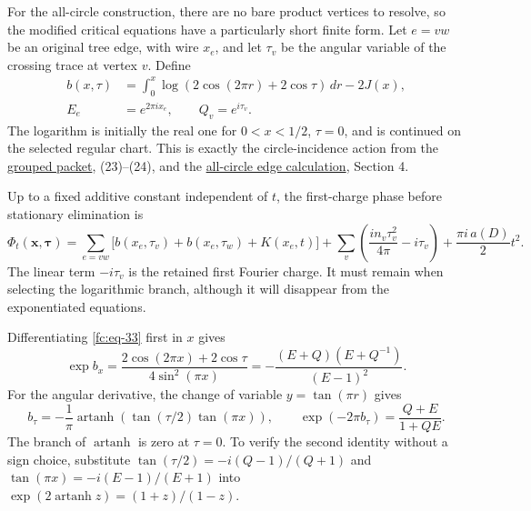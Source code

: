 For the all-circle construction, there are no bare product vertices to resolve, so the modified critical equations have a particularly short finite form. Let \(e=vw\) be an original tree edge, with wire \(x_e\), and let \(\tau_v\) be the angular variable of the crossing trace at vertex \(v\). Define
\begin{equation}\label{fc:eq-33}
\begin{aligned}
 b(x,\tau)
   &=\int_0^x\log(2\cos(2\pi r)+2\cos\tau)\,dr-2J(x),\\
 E_e&=e^{2\pi i x_e},\qquad Q_v=e^{i\tau_v}.
 \end{aligned}
\end{equation}
 The logarithm is initially the real one for \(0<x<1/2\), \(\tau=0\), and is continued on the selected regular chart. This is exactly the circle-incidence action from the \href{https://sashakolpakov.github.io/murakamis_dream/notes/actual_main_meridian_grouped_wire_packet.html}{grouped packet}, (23)--(24), and the \href{https://sashakolpakov.github.io/murakamis_dream/notes/actual_all_circle_curvature_filling_limit.html}{all-circle edge calculation}, Section 4.

Up to a fixed additive constant independent of \(t\), the first-charge phase before stationary elimination is
\begin{equation}\label{fc:eq-34}
\Phi_t(\mathbf x,\boldsymbol\tau)=
 \sum_{e=vw}\bigl[b(x_e,\tau_v)+b(x_e,\tau_w)+K(x_e,t)\bigr]
 +\sum_v\left(\frac{i n_v\tau_v^2}{4\pi}-i\tau_v\right)
 +\frac{\pi i\,a(D)}2t^2.
\end{equation}
 The linear term \(-i\tau_v\) is the retained first Fourier charge. It must remain when selecting the logarithmic branch, although it will disappear from the exponentiated equations.

Differentiating \eqref{fc:eq-33} first in \(x\) gives
\begin{equation}\label{fc:eq-35}
\exp b_x
 =\frac{2\cos(2\pi x)+2\cos\tau}{4\sin^2(\pi x)}
 =-\frac{(E+Q)(E+Q^{-1})}{(E-1)^2}.
\end{equation}
 For the angular derivative, the change of variable \(y=\tan(\pi r)\) gives
\begin{equation}\label{fc:eq-36}
b_\tau=-\frac1\pi
  \operatorname{artanh}\!\left(\tan(\tau/2)\tan(\pi x)\right),
 \qquad
 \exp(-2\pi b_\tau)=\frac{Q+E}{1+QE}.
\end{equation}
 The branch of \(\operatorname{artanh}\) is zero at \(\tau=0\). To verify the second identity without a sign choice, substitute \(\tan(\tau/2)=-i(Q-1)/(Q+1)\) and \(\tan(\pi x)=-i(E-1)/(E+1)\) into \(\exp(2\operatorname{artanh}z)=(1+z)/(1-z)\).

